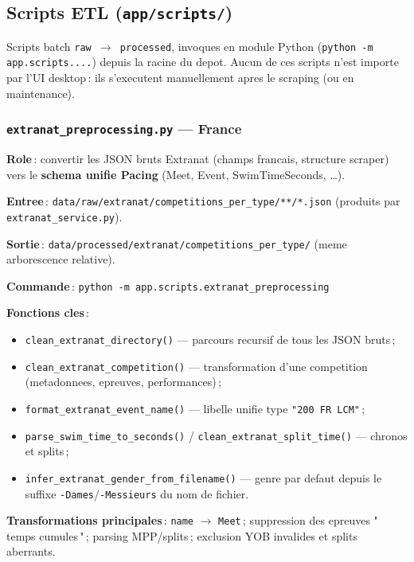 \documentclass[11pt,a4paper]{article}
\begin{document}
\subsection{Scripts ETL (\texttt{app/scripts/})}

Scripts batch \texttt{raw $\rightarrow$ processed}, invoques en module Python (\texttt{python -m app.scripts....}) depuis la racine du depot. Aucun de ces scripts n'est importe par l'UI desktop\,: ils s'executent manuellement apres le scraping (ou en maintenance).

\subsubsection{\texttt{extranat\_preprocessing.py} --- France}

\textbf{Role}\,: convertir les JSON bruts Extranat (champs francais, structure scraper) vers le \textbf{schema unifie Pacing} (Meet, Event, SwimTimeSeconds, \ldots).

\textbf{Entree}\,: \texttt{data/raw/extranat/competitions\_per\_type/**/*.json} (produits par \texttt{extranat\_service.py}).

\textbf{Sortie}\,: \texttt{data/processed/extranat/competitions\_per\_type/} (meme arborescence relative).

\textbf{Commande}\,: \texttt{python -m app.scripts.extranat\_preprocessing}

\textbf{Fonctions cles}\,:
\begin{itemize}
  \item \texttt{clean\_extranat\_directory()} --- parcours recursif de tous les JSON bruts\,;
  \item \texttt{clean\_extranat\_competition()} --- transformation d'une competition (metadonnees, epreuves, performances)\,;
  \item \texttt{format\_extranat\_event\_name()} --- libelle unifie type \texttt{"200 FR LCM"}\,;
  \item \texttt{parse\_swim\_time\_to\_seconds()} / \texttt{clean\_extranat\_split\_time()} --- chronos et splits\,;
  \item \texttt{infer\_extranat\_gender\_from\_filename()} --- genre par defaut depuis le suffixe \texttt{-Dames}/\texttt{-Messieurs} du nom de fichier.
\end{itemize}

\textbf{Transformations principales}\,: \texttt{name} $\rightarrow$ \texttt{Meet}\,; suppression des epreuves "\,temps cumules\,"\,; parsing MPP/splits\,; exclusion YOB invalides et splits aberrants.
\end{document}
